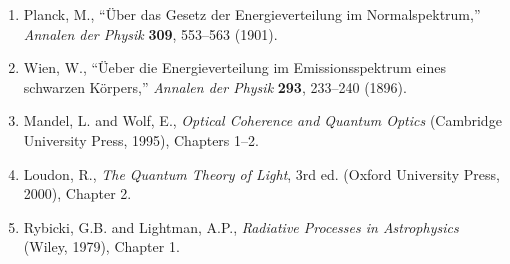 \begin{enumerate}
\item Planck, M., ``\"Uber das Gesetz der Energieverteilung im Normalspektrum,'' \textit{Annalen der Physik} \textbf{309}, 553--563 (1901).
\item Wien, W., ``\"Ueber die Energieverteilung im Emissionsspektrum eines schwarzen K\"orpers,'' \textit{Annalen der Physik} \textbf{293}, 233--240 (1896).
\item Mandel, L. and Wolf, E., \textit{Optical Coherence and Quantum Optics} (Cambridge University Press, 1995), Chapters 1--2.
\item Loudon, R., \textit{The Quantum Theory of Light}, 3rd ed. (Oxford University Press, 2000), Chapter 2.
\item Rybicki, G.B. and Lightman, A.P., \textit{Radiative Processes in Astrophysics} (Wiley, 1979), Chapter 1.
\end{enumerate}


